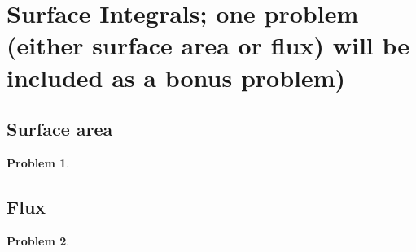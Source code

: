 \documentclass{article}
\newtheorem{problem}{Problem}
\begin{document}
\section{Surface Integrals; one problem (either surface area or flux) will be included as a bonus problem)}
\subsection{Surface area}
\begin{problem}

\end{problem}
\subsection{Flux}
\begin{problem}

\end{problem}
\end{document}
